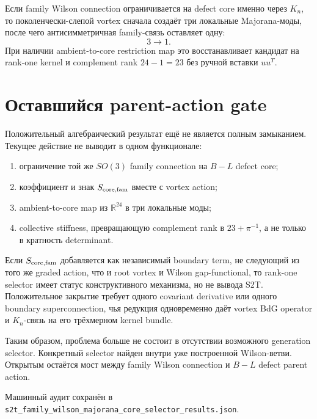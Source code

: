 \begin{proposition}
Если family Wilson connection ограничивается на defect core именно через
\(K_n\), то поколенчески-слепой vortex сначала создаёт три локальные
Majorana-моды, после чего антисимметричная family-связь оставляет одну:
\begin{equation}
 3\longrightarrow1.
\end{equation}
При наличии ambient-to-core restriction map это восстанавливает кандидат на
rank-one kernel и complement rank \(24-1=23\) без ручной вставки \(uu^T\).
\end{proposition}

\section{Оставшийся parent-action gate}

Положительный алгебраический результат ещё не является полным замыканием.
Текущее действие не выводит в одном функционале:
\begin{enumerate}
 \item ограничение той же \(SO(3)\) family connection на \(B-L\) defect core;
 \item коэффициент и знак \(S_{\rm core,fam}\) вместе с vortex action;
 \item ambient-to-core map из \(\mathbb R^{24}\) в три локальные моды;
 \item collective stiffness, превращающую complement rank в
 \(23+\pi^{-1}\), а не только в кратность determinant.
\end{enumerate}

\begin{nogocriterion}
Если \(S_{\rm core,fam}\) добавляется как независимый boundary term, не
следующий из того же graded action, что и root vortex и Wilson gap-functional,
то rank-one selector имеет статус конструктивного механизма, но не вывода
S2T. Положительное закрытие требует одного covariant derivative или одного
boundary superconnection, чья редукция одновременно даёт vortex BdG operator
и \(K_n\)-связь на его трёхмерном kernel bundle.
\end{nogocriterion}

Таким образом, проблема больше не состоит в отсутствии возможного generation
selector. Конкретный selector найден внутри уже построенной Wilson-ветви.
Открытым остаётся мост между family Wilson connection и \(B-L\) defect
parent action.

Машинный аудит сохранён в
\texttt{s2t\_family\_wilson\_majorana\_core\_selector\_results.json}.